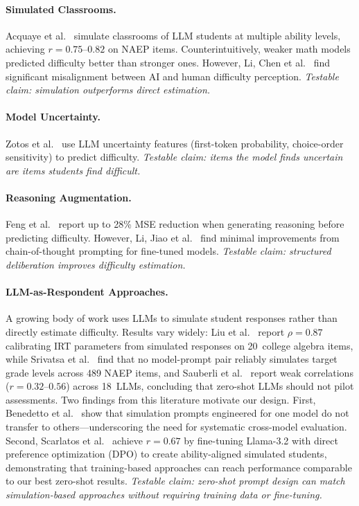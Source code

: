 \documentclass[runningheads]{llncs}
\begin{document}
\paragraph{Simulated Classrooms.}
Acquaye et al.~\cite{acquaye2025} simulate classrooms of LLM students at multiple ability levels, achieving $r=0.75$--$0.82$ on NAEP items. Counterintuitively, weaker math models predicted difficulty better than stronger ones. However, Li, Chen et al.~\cite{lichen2025} find significant misalignment between AI and human difficulty perception. \emph{Testable claim: simulation outperforms direct estimation.}

\paragraph{Model Uncertainty.}
Zotos et al.~\cite{zotos2025} use LLM uncertainty features (first-token probability, choice-order sensitivity) to predict difficulty. \emph{Testable claim: items the model finds uncertain are items students find difficult.}

\paragraph{Reasoning Augmentation.}
Feng et al.~\cite{feng2025} report up to 28\% MSE reduction when generating reasoning before predicting difficulty. However, Li, Jiao et al.~\cite{lijiao2025} find minimal improvements from chain-of-thought prompting for fine-tuned models. \emph{Testable claim: structured deliberation improves difficulty estimation.}

\paragraph{LLM-as-Respondent Approaches.}
A growing body of work uses LLMs to simulate student responses rather than directly estimate difficulty. Results vary widely: Liu et al.~\cite{liu2024} report $\rho = 0.87$ calibrating IRT parameters from simulated responses on 20~college algebra items, while Srivatsa et al.~\cite{srivatsa2025} find that no model-prompt pair reliably simulates target grade levels across 489 NAEP items, and Sauberli et al.~\cite{sauberli2025} report weak correlations ($r = 0.32$--$0.56$) across 18~LLMs, concluding that zero-shot LLMs should not pilot assessments. Two findings from this literature motivate our design. First, Benedetto et al.~\cite{benedetto2024} show that simulation prompts engineered for one model do not transfer to others---underscoring the need for systematic cross-model evaluation. Second, Scarlatos et al.~\cite{scarlatos2025} achieve $r = 0.67$ by fine-tuning Llama-3.2 with direct preference optimization (DPO) to create ability-aligned simulated students, demonstrating that training-based approaches can reach performance comparable to our best zero-shot results. \emph{Testable claim: zero-shot prompt design can match simulation-based approaches without requiring training data or fine-tuning.}
\end{document}
